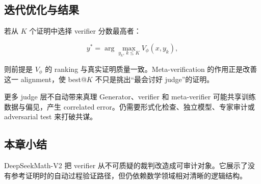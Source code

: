 \subsection{迭代优化与结果}




若从 $K$ 个证明中选择 verifier 分数最高者：

$$
y^*=\arg\max_{y_k,\,k\le K}V_\phi(x,y_k),
$$

则前提是 $V_\phi$ 的 ranking 与真实证明质量一致。Meta-verification 的作用正是改善这一 alignment，使 best@$K$ 不只是挑出“最会讨好 judge”的证明。

\begin{warningbox}{更多 judge 层不自动带来真理}
Generator、verifier 和 meta-verifier 可能共享训练数据与偏见，产生 correlated error。仍需要形式化检查、独立模型、专家审计或 adversarial test 来打破共谋。
\end{warningbox}

\subsection{本章小结}

DeepSeekMath-V2 把 verifier 从不可质疑的裁判改造成可审计对象。它展示了没有参考证明时的自动过程验证路径，但仍依赖数学领域相对清晰的逻辑结构。

